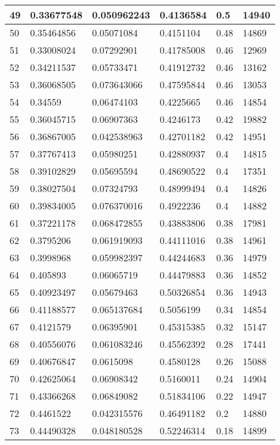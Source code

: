 \begin{longtable}{|l|l|l|l|l|l|}
49 & 0.33677548 & 0.050962243 & 0.4136584 & 0.5 & 14940 \\ \hline 
50 & 0.35464856 & 0.05071084 & 0.4151104 & 0.48 & 14869 \\ \hline 
51 & 0.33008024 & 0.07292901 & 0.41785008 & 0.46 & 12969 \\ \hline 
52 & 0.34211537 & 0.05733471 & 0.41912732 & 0.46 & 13162 \\ \hline 
53 & 0.36068505 & 0.073643066 & 0.47595844 & 0.46 & 13053 \\ \hline 
54 & 0.34559 & 0.06474103 & 0.4225665 & 0.46 & 14854 \\ \hline 
55 & 0.36045715 & 0.06907363 & 0.4246173 & 0.42 & 19882 \\ \hline 
56 & 0.36867005 & 0.042538963 & 0.42701182 & 0.42 & 14951 \\ \hline 
57 & 0.37767413 & 0.05980251 & 0.42880937 & 0.4 & 14815 \\ \hline 
58 & 0.39102829 & 0.05695594 & 0.48690522 & 0.4 & 17351 \\ \hline 
59 & 0.38027504 & 0.07324793 & 0.48999494 & 0.4 & 14826 \\ \hline 
60 & 0.39834005 & 0.076370016 & 0.4922236 & 0.4 & 14882 \\ \hline 
61 & 0.37221178 & 0.068472855 & 0.43883806 & 0.38 & 17981 \\ \hline 
62 & 0.3795206 & 0.061919093 & 0.44111016 & 0.38 & 14961 \\ \hline 
63 & 0.3998968 & 0.059982397 & 0.44244683 & 0.36 & 14979 \\ \hline 
64 & 0.405893 & 0.06065719 & 0.44479883 & 0.36 & 14852 \\ \hline 
65 & 0.40923497 & 0.05679463 & 0.50326854 & 0.36 & 14943 \\ \hline 
66 & 0.41188577 & 0.065137684 & 0.5056199 & 0.34 & 14854 \\ \hline 
67 & 0.4121579 & 0.06395901 & 0.45315385 & 0.32 & 15147 \\ \hline 
68 & 0.40556076 & 0.061083246 & 0.45562392 & 0.28 & 17441 \\ \hline 
69 & 0.40676847 & 0.0615098 & 0.4580128 & 0.26 & 15088 \\ \hline 
70 & 0.42625064 & 0.06908342 & 0.5160011 & 0.24 & 14904 \\ \hline 
71 & 0.43366268 & 0.06849082 & 0.51834106 & 0.22 & 14947 \\ \hline 
72 & 0.4461522 & 0.042315576 & 0.46491182 & 0.2 & 14880 \\ \hline 
73 & 0.44490328 & 0.048180528 & 0.52246314 & 0.18 & 14899 \\ \hline 

\end{longtable}
